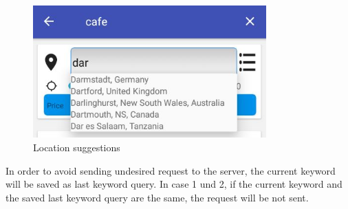 \begin{figure}[htbp]
	\includegraphics[width=0.8\textwidth]{images/suggestedlocations.jpg}
	\centering
	\caption[]{Location suggestions}
	\label{fig:locationSuggestions}
\end{figure} 
In order to avoid sending undesired request to the server, the current keyword will be saved as last keyword query. In case 1 und 2, if the current keyword and the saved last keyword query are the same, the request will be not sent. 

